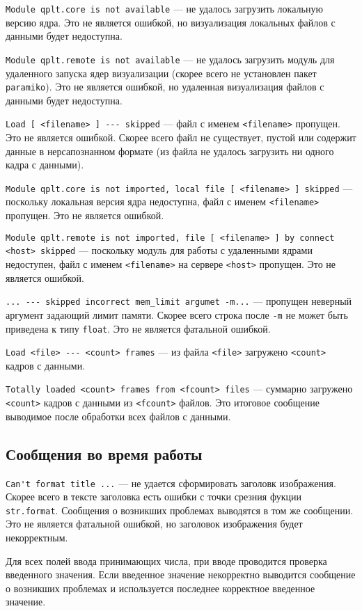 \documentclass[12pt]{article}
\begin{document}
\verb'Module qplt.core is not available' --- не удалось загрузить локальную версию ядра. Это не является ошибкой, но визуализация локальных файлов с данными будет недоступна.

\verb'Module qplt.remote is not available' --- не удалось загрузить модуль для удаленного запуска ядер визуализации (скорее всего не установлен пакет \verb'paramiko').
Это не является ошибкой, но удаленная визуализация файлов с данными будет недоступна.

\verb'Load [ <filename> ] --- skipped' --- файл с именем \verb'<filename>' пропущен. Это не является ошибкой.
Скорее всего файл не существует, пустой или содержит данные в нерсапознанном формате (из файла не удалось загрузить ни одного кадра с данными). 

\verb'Module qplt.core is not imported, local file [ <filename> ] skipped' --- поскольку локальная версия ядра недоступна,
файл с именем \verb'<filename>' пропущен. Это не является ошибкой.

\verb'Module qplt.remote is not imported, file [ <filename> ] by connect <host> skipped' --- поскольку модуль для работы с удаленными ядрами недоступен,
файл с именем \verb'<filename>'  на сервере \verb'<host>' пропущен. Это не является ошибкой.

\verb'... --- skipped incorrect mem_limit argumet -m...' --- пропущен неверный аргумент задающий лимит памяти. Скорее всего строка после \verb'-m'
не может быть приведена к типу \verb'float'. Это не является фатальной ошибкой.

\verb'Load <file> --- <count> frames' --- из файла \verb'<file>' загружено \verb'<count>' кадров с данными.

\verb'Totally loaded <count> frames from <fcount> files' --- суммарно загружено \verb'<count>' кадров с данными из \verb'<fcount>' файлов. Это итоговое сообщение
выводимое после обработки всех файлов с данными.

\subsection{Сообщения во время работы}
\verb|Can't format title ...| --- не удается сформировать заголовк изображения. Скорее всего в тексте заголовка есть ошибки с точки срезния фукции \verb'str.format'.
Сообщения о возникших проблемах выводятся в том же сообщении. Это не является фатальной ошибкой, но заголовок изображения будет некорректным.

Для всех полей ввода принимающих числа, при вводе проводится проверка введенного значения. Если  введенное значение некорректно выводится сообщение
о возникших проблемах и используется последнее корректное введенное значение.
\end{document}

